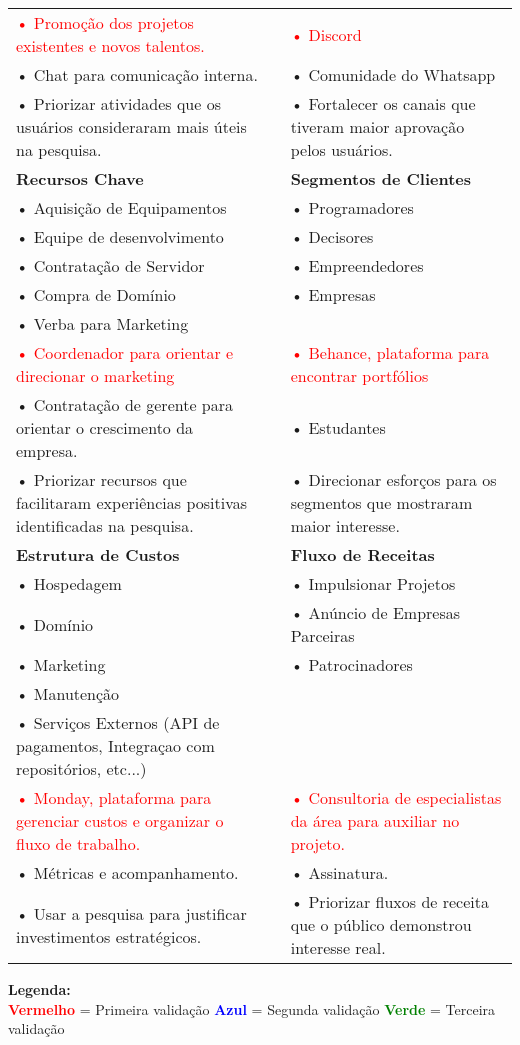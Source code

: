 \documentclass{article}
\begin{document}
\begin{table}[h!]
\begin{tabular}{|p{6cm}|p{6cm}|p{6cm}|}
\textcolor{red}{• Promoção dos projetos existentes e novos talentos.} & 
& 
\textcolor{red}{• Discord} \\
\textcolor{blueval}{• Chat para comunicação interna.} &
& 
\textcolor{blueval}{• Comunidade do Whatsapp} \\
\textcolor{greenval}{• Priorizar atividades que os usuários consideraram mais úteis na pesquisa.} &
&
\textcolor{greenval}{• Fortalecer os canais que tiveram maior aprovação pelos usuários.} \\

\hline
\rowcolor{lightgray}
\textbf{Recursos Chave} & & \textbf{Segmentos de Clientes} \\
\cline{1-1}\cline{2-2}\cline{3-3}
• Aquisição de Equipamentos & & • Programadores \\
• Equipe de desenvolvimento & & • Decisores \\
• Contratação de Servidor & & • Empreendedores \\
• Compra de Domínio & & • Empresas \\
• Verba para Marketing & & \\
\textcolor{red}{• Coordenador para orientar e direcionar o marketing} &
& 
\textcolor{red}{• Behance, plataforma para encontrar portfólios} \\
\textcolor{blueval}{• Contratação de gerente para orientar o crescimento da empresa.} &
& 
\textcolor{blueval}{• Estudantes} \\
\textcolor{greenval}{• Priorizar recursos que facilitaram experiências positivas identificadas na pesquisa.} &
&
\textcolor{greenval}{• Direcionar esforços para os segmentos que mostraram maior interesse.} \\
\hline
\rowcolor{lightgray}
\textbf{Estrutura de Custos} & & \textbf{Fluxo de Receitas} \\
\hline
• Hospedagem & & • Impulsionar Projetos \\
• Domínio & & • Anúncio de Empresas Parceiras \\
• Marketing & & • Patrocinadores \\
• Manutenção & & \\
• Serviços Externos (API de pagamentos, Integraçao com repositórios, etc...) & & \\
\textcolor{red}{• Monday, plataforma para gerenciar custos e organizar o fluxo de trabalho.} &
&
\textcolor{red}{• Consultoria de especialistas da área para auxiliar no projeto.} \\
\textcolor{blueval}{• Métricas e acompanhamento.} &
&
\textcolor{blueval}{• Assinatura.} \\
\textcolor{greenval}{• Usar a pesquisa para justificar investimentos estratégicos.} &
&
\textcolor{greenval}{• Priorizar fluxos de receita que o público demonstrou interesse real.} \\
\hline
\end{tabular}

\begin{center}
\textbf{Legenda:} \\
\textcolor{red}{\textbf{Vermelho}} = Primeira validação \quad
\textcolor{blue}{\textbf{Azul}} = Segunda validação \quad
\textcolor{green}{\textbf{Verde}} = Terceira validação
\end{center}

\end{table}
\end{document}

